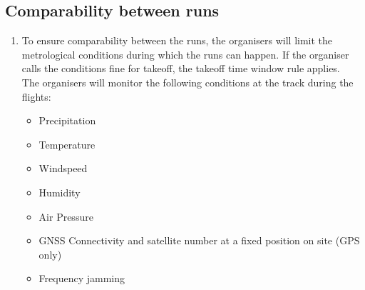     \subsection{Comparability between runs}
    \begin{enumerate}
      \item To ensure comparability between the runs, the organisers will limit the metrological conditions during which the runs can happen. If the organiser calls the conditions fine for takeoff, the takeoff time window rule applies. \\
      The organisers will monitor the following conditions at the track during the flights:
      \begin{itemize}
        \item Precipitation
        \item Temperature 
        \item Windspeed
        \item Humidity
        \item Air Pressure
        \item GNSS Connectivity and satellite number at a fixed position on site (GPS only) 
        \item Frequency jamming
      \end{itemize}
    \end{enumerate}

